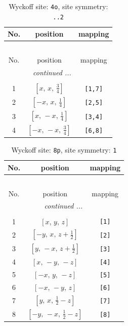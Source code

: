 \documentclass[fleqn,8pt]{jsarticle}
\begin{document}
\renewcommand{\arraystretch}{1.2}
\begin{longtable}{ccc}
\caption{Wyckoff site: {\tt 4o}, site symmetry: {\tt ..2}}
 \\
 \hline \hline
No. & position & mapping \\ \hline \endfirsthead

\multicolumn{2}{l}{\tablename\ \thetable{}} \\
 \hline \hline
No. & position & mapping \\ \hline \endhead

 \hline \hline
\multicolumn{2}{r}{\footnotesize\it continued ...} \\ \endfoot

 \hline \hline
\multicolumn{2}{r}{} \\ \endlastfoot

1 & $\left[ x,\, x,\, \frac{3}{4} \right]$ & {\tt [1,7]} \\ \hline
2 & $\left[ - x,\, x,\, \frac{1}{4} \right]$ & {\tt [2,5]} \\ \hline
3 & $\left[ x,\, - x,\, \frac{1}{4} \right]$ & {\tt [3,4]} \\ \hline
4 & $\left[ - x,\, - x,\, \frac{3}{4} \right]$ & {\tt [6,8]} \\
\end{longtable}
\renewcommand{\arraystretch}{1.2}
\begin{longtable}{ccc}
\caption{Wyckoff site: {\tt 8p}, site symmetry: {\tt 1}}
 \\
 \hline \hline
No. & position & mapping \\ \hline \endfirsthead

\multicolumn{2}{l}{\tablename\ \thetable{}} \\
 \hline \hline
No. & position & mapping \\ \hline \endhead

 \hline \hline
\multicolumn{2}{r}{\footnotesize\it continued ...} \\ \endfoot

 \hline \hline
\multicolumn{2}{r}{} \\ \endlastfoot

1 & $\left[ x,\, y,\, z \right]$ & {\tt [1]} \\ \hline
2 & $\left[ - y,\, x,\, z + \frac{1}{2} \right]$ & {\tt [2]} \\ \hline
3 & $\left[ y,\, - x,\, z + \frac{1}{2} \right]$ & {\tt [3]} \\ \hline
4 & $\left[ x,\, - y,\, - z \right]$ & {\tt [4]} \\ \hline
5 & $\left[ - x,\, y,\, - z \right]$ & {\tt [5]} \\ \hline
6 & $\left[ - x,\, - y,\, z \right]$ & {\tt [6]} \\ \hline
7 & $\left[ y,\, x,\, \frac{1}{2} - z \right]$ & {\tt [7]} \\ \hline
8 & $\left[ - y,\, - x,\, \frac{1}{2} - z \right]$ & {\tt [8]} \\
\end{longtable}
\end{document}
